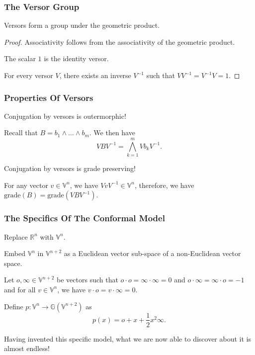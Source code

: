 \documentclass{beamer}
\newcommand{\G}{\mathbb{G}}
\newcommand{\V}{\mathbb{V}}
\newcommand{\R}{\mathbb{R}}
\newcommand{\nvao}{o}
\newcommand{\nvai}{\infty}
\newcommand{\grade}{\mbox{grade}}
\begin{document}
\begin{frame}
\frametitle{The Versor Group}
\pause
Versors form a group under the geometric product.\pause
\begin{proof}
\alert{Associativity} follows from the associativity of the geometric product.

The scalar $1$ is the \alert{identity} versor.

For every versor $V$, there exists an \alert{inverse} $V^{-1}$ such that $VV^{-1}=V^{-1}V=1$.
\end{proof}
\end{frame}

\begin{frame}
\frametitle{Properties Of Versors}
\pause
Conjugation by versors is \alert{outermorphic}!\pause

Recall that $B=b_1\wedge\dots\wedge b_m$.
We then have
\begin{equation*}
VBV^{-1} = \bigwedge_{k=1}^m Vb_kV^{-1}.
\end{equation*}\pause

Conjugation by versors is \alert{grade preserving}!\pause

For any vector $v\in\V^n$, we have $VvV^{-1}\in\V^n$,
therefore, we have $\grade(B)=\grade(VBV^{-1})$.

\end{frame}

\begin{frame}
\frametitle{The Specifics Of The Conformal Model}
\pause
Replace $\R^n$ with $\V^n$.\pause

Embed $\V^n$ in $\V^{n+2}$ as a \alert{Euclidean} vector sub-space of a \alert{non-Euclidean} vector space.\pause

Let $\nvao,\nvai\in\V^{n+2}$ be vectors such that $\nvao\cdot\nvao=\nvai\cdot\nvai=0$
and $\nvao\cdot\nvai=\nvai\cdot\nvao=-1$ and for all $v\in\V^n$, we have $v\cdot\nvao=v\cdot\nvai=0$.\pause

\begin{definition}
Define $p:\V^n\to\G(\V^{n+2})$ as
\begin{equation*}
p(x) = \nvao + x + \frac{1}{2}x^2\nvai.
\end{equation*}
\end{definition}\pause
Having \alert{invented} this specific model, what we are now able to \alert{discover} about it is almost endless!
\end{frame}
\end{document}
